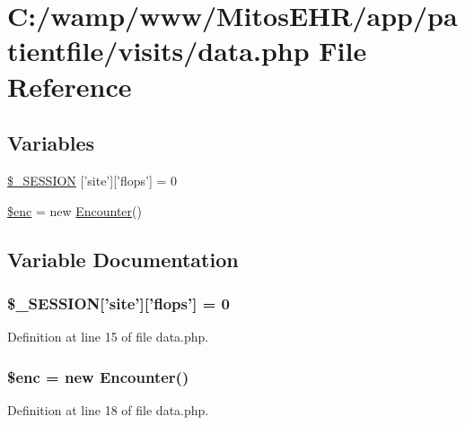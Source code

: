 \hypertarget{patientfile_2visits_2data_8php}{\section{\-C\-:/wamp/www/\-Mitos\-E\-H\-R/app/patientfile/visits/data.php \-File \-Reference}
\label{patientfile_2visits_2data_8php}
}
\subsection*{\-Variables}
\begin{DoxyCompactItemize}
\item 
\hyperlink{patientfile_2visits_2data_8php_a99fda8552a3e58235643b79f5af3ded8}{\$\-\_\-\-S\-E\-S\-S\-I\-O\-N} \mbox{[}'site'\mbox{]}\mbox{[}'flops'\mbox{]} = 0
\item 
\hyperlink{patientfile_2visits_2data_8php_ac35f45ece02c139742f8d3edacae5925}{\$enc} = new \hyperlink{class_encounter}{\-Encounter}()
\end{DoxyCompactItemize}


\subsection{\-Variable \-Documentation}
\hypertarget{patientfile_2visits_2data_8php_a99fda8552a3e58235643b79f5af3ded8}{
\subsubsection[{\$\-\_\-\-S\-E\-S\-S\-I\-O\-N}]{\setlength{\rightskip}{0pt plus 5cm}\$\-\_\-\-S\-E\-S\-S\-I\-O\-N\mbox{[}'site'\mbox{]}\mbox{[}'flops'\mbox{]} = 0}}\label{patientfile_2visits_2data_8php_a99fda8552a3e58235643b79f5af3ded8}


\-Definition at line 15 of file data.\-php.

\hypertarget{patientfile_2visits_2data_8php_ac35f45ece02c139742f8d3edacae5925}{
\subsubsection[{\$enc}]{\setlength{\rightskip}{0pt plus 5cm}\$enc = new {\bf \-Encounter}()}}\label{patientfile_2visits_2data_8php_ac35f45ece02c139742f8d3edacae5925}


\-Definition at line 18 of file data.\-php.

